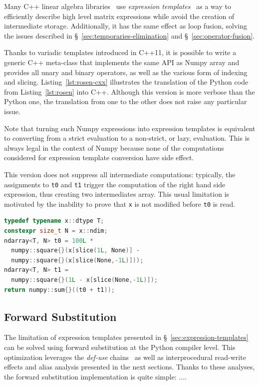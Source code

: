 \documentclass[10pt, preprint]{sigplanconf}
\begin{document}
Many C++ linear algebra libraries~\cite{eigen,ublas,esterie2014} use \emph{expression
templates}~\cite{expression_templates, et2012} as a way to efficiently describe high
level matrix expressions while avoid the creation of intermediate storage.
Additionally, it has the same effect as loop fusion, solving the issues
described in \S~\ref{sec:temporaries-elimination} and
\S~\ref{sec:operator-fusion}.

Thanks to variadic templates introduced in C++11, it is possible to write a
generic C++ meta-class that implements the same API as Numpy array and provides
all unary and binary operators, as well as the various form of indexing and
slicing. Listing~\ref{lst:rosen-cxx} illustrates the translation of the Python
code from Listing~\ref{lst:rosen} into C++. Although this version is more
verbose than the Python one, the translation from one to the other does not
raise any particular issue.

Note that turning such Numpy expressions into expression templates is
equivalent to converting from a strict evaluation to a non-strict, or lazy,
evaluation. This is always legal in the context of Numpy because none of the
computations considered for expression template conversion have side effect.

This version does not suppress all intermediate computations: typically, the
assignments to \texttt{t0} and \texttt{t1} trigger the computation of the right
hand side expression, thus creating two intermediates array. This usual
limitation is motivated by the inability to prove that \texttt{x} is not
modified before \texttt{t0} is read.

\begin{lstlisting}[language=c++,
  caption={C++11 translated version of Python version for the Rosenbrock
           kernel.},
  label={lst:rosen-cxx},
  breaklines=true,
  basicstyle=\small]
typedef typename x::dtype T;
constexpr size_t N = x::ndim;
ndarray<T, N> t0 = 100L *
  numpy::square{}(x[slice(1L, None)] -
  numpy::square{}(x[slice(None,-1L)]));
ndarray<T, N> t1 =
  numpy::square{}(1L - x[slice(None,-1L)]);
return numpy::sum{}((t0 + t1));
\end{lstlisting}


\subsection{Forward Substitution}
\label{sec:fs}

The limitation of expression templates presented in
\S~\ref{sec:expression-templates} can be solved using forward substitution at
the Python compiler level. This optimization leverages the
\textit{def-use} chains~\cite{defuse} as well as interprocedural read-write
effects and alias analysis presented in the next sections.
Thanks to these analyses, the forward substitution implementation is quite
simple: ....
\end{document}
